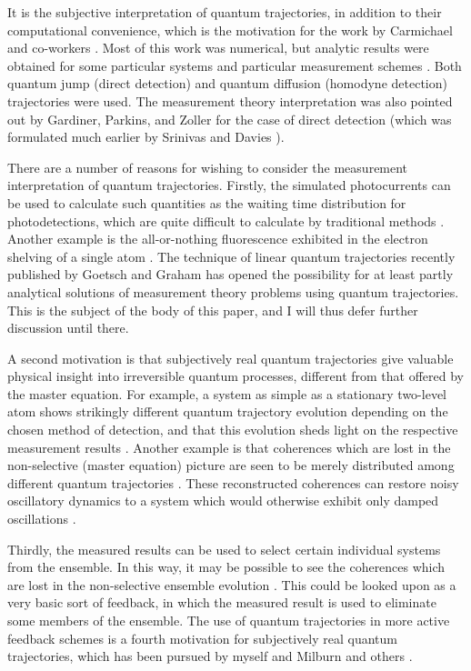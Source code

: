 \documentclass[12pt]{article}
\begin{document}
It is the subjective interpretation 
of quantum trajectories, in addition to their computational convenience,  which is the
motivation for the work by Carmichael and co-workers 
\cite{Car93b,AlsCar91,TiaCar92,Car93a,CarKocTia94,KocCarMorRai95}. Most
of this work was numerical, but analytic results were obtained for  some particular
systems and particular measurement schemes  \cite{Car93a,CarKocTia94}. Both quantum 
jump (direct detection) and quantum diffusion (homodyne detection) trajectories were
used. The measurement theory interpretation was also pointed out by Gardiner,
Parkins, and Zoller \cite{GarParZol92} for the case of direct detection (which was
formulated much earlier by Srinivas and Davies \cite{SriDav81}). 

There are a number of reasons for wishing to consider the measurement 
interpretation of quantum trajectories. Firstly, the simulated photocurrents 
can be used to calculate such quantities as the waiting time distribution for 
photodetections, which are quite difficult to calculate by traditional 
methods \cite{CarSinVyaRic89}. Another example is the all-or-nothing fluorescence
exhibited in the electron shelving of a single atom \cite{Coo88,GagMil93}. The  
technique of linear quantum trajectories recently published by Goetsch and Graham
\cite{GoeGra94b} has opened the possibility for at least partly analytical
solutions of measurement theory problems using quantum trajectories. This is the
subject of the body of this paper, and I will thus defer further discussion until
there. 

A second motivation is  that subjectively real
quantum trajectories give valuable  physical insight into irreversible quantum
processes, different from that offered by the master equation. For example, a
system as simple as a stationary two-level atom shows strikingly different quantum
trajectory evolution depending on the chosen method of detection, and that this
evolution sheds light on the respective  measurement results \cite{WisMil93c}.
Another example is that coherences which are lost in the non-selective (master 
equation) picture are seen to be merely distributed among different  quantum
trajectories \cite{Car93b,AlsCar91,CarKocTia94,GoeGraHaa95a,GarKni94}. These
reconstructed coherences can restore noisy oscillatory dynamics to a
system which would otherwise exhibit only damped oscillations
\cite{QuaColWal95}.

Thirdly, the measured  results can be used to select certain individual systems from
the  ensemble. In this way, it may be possible to see the coherences which are  lost
in the non-selective ensemble evolution  \cite{CarKocTia94,KocCarMorRai95}.
This could be looked upon as a very  basic sort of feedback, in which the measured
result is used to eliminate  some members of the ensemble. The use of quantum
trajectories in more active feedback schemes is a fourth motivation for subjectively
real quantum trajectories, which has been pursued by myself and Milburn and others 
\cite{WisMil93b,WisMil94a,Wis94a,WisMil94b,LieMil95,Wis95a,Wis95b}.
\end{document}
